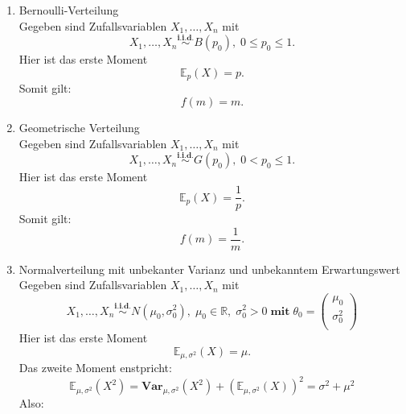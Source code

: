 \documentclass[10pt]{article}
\newcommand{\FZV}{X_1, \ldots, X_n} %
\newcommand{\IR}{\mathbb{R}} %
\newcommand{\EW}{\mathbb{E}} %
\newenvironment{BSP}[1][]
{\begin{Beispiel}[frametitle=#1]}{\end{Beispiel}}
\begin{document}
	\begin{BSP}[Beispiel 1.3.1 (Momentenmethoden-Schätzer)]
		\begin{enumerate}[label = (\roman*)]
			\item Bernoulli-Verteilung \\
			Gegeben sind Zufallsvariablen $\FZV$ mit
			\begin{equation*}
				\FZV \overset{\textbf{i.i.d.}}{\sim} B(p_0), \; 0 \leq p_0 \leq 1.
			\end{equation*} 
			Hier ist das erste Moment
			\begin{equation*}
				\EW_p(X)=p.
			\end{equation*}
			Somit gilt:
			\begin{equation*}
				f(m)=m.
			\end{equation*}
			
			\item Geometrische Verteilung \\
			Gegeben sind Zufallsvariablen $\FZV$ mit
			\begin{equation*}
				\FZV \overset{\textbf{i.i.d.}}{\sim} G(p_0), \; 0 < p_0 \leq 1.
			\end{equation*} 
			Hier ist das erste Moment
			\begin{equation*}
				\EW_p(X) = \frac{1}{p}.
			\end{equation*}
			Somit gilt:
			\begin{equation*}
				f(m)=\frac{1}{m}.
			\end{equation*}
			
			
			\item Normalverteilung mit unbekanter Varianz und unbekanntem Erwartungswert\\
			Gegeben sind Zufallsvariablen $\FZV$ mit
			\begin{equation*}
				\FZV \overset{\textbf{i.i.d.}} {\sim} N(\mu_0,\sigma_0^2),\; \mu_0 \in \IR, \; \sigma_0^2 >0 \; \textbf{mit} \; \theta_0 = \left(
				\begin{array}{c}
					\mu_0\\
					\sigma_0^2\\
				\end{array}
				\right)
			\end{equation*} 
			Hier ist das erste Moment
			\begin{equation*}
				\EW_{\mu,\sigma^2}(X)=\mu.
			\end{equation*}
			Das zweite Moment enstpricht: 
			\begin{equation*}
				\EW_{\mu,\sigma^2}(X^2)=\textbf{Var}_{\mu,\sigma^2}(X^2) + (\EW_{\mu,\sigma^2}(X))^2 = \sigma^2 + \mu^2
			\end{equation*}
			Also:
			

\end{enumerate}
\end{BSP}
\end{document}
